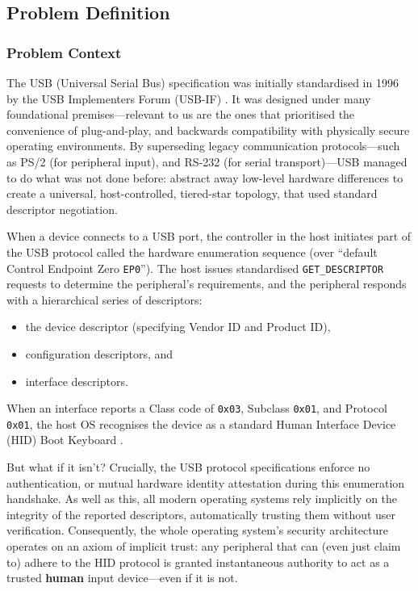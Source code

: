 \subsection{Problem Definition}

\subsubsection{Problem Context}

The USB (Universal Serial Bus) specification was initially standardised in 1996 by the USB Implementers Forum (USB-IF) \cite{usb10spec}. It was designed under many foundational premises---relevant to us are the ones that prioritised the convenience of plug-and-play, and backwards compatibility with physically secure operating environments. By superseding legacy communication protocols---such as PS/2 (for peripheral input), and RS-232 (for serial transport)---USB managed to do what was not done before: abstract away low-level hardware differences to create a universal, host-controlled, tiered-star topology, that used standard descriptor negotiation.

When a device connects to a USB port, the controller in the host initiates part of the USB protocol called the hardware enumeration sequence (over ``default Control Endpoint Zero \texttt{EP0}''). The host issues standardised \texttt{GET\_DESCRIPTOR} requests to determine the peripheral's requirements, and the peripheral responds with a hierarchical series of descriptors:

\begin{itemize}
	\item the device descriptor (specifying Vendor ID and Product ID),
	\item configuration descriptors, and
	\item interface descriptors.
\end{itemize}

When an interface reports a Class code of \texttt{0x03}, Subclass \texttt{0x01}, and Protocol \texttt{0x01}, the host OS recognises the device as a standard Human Interface Device (HID) Boot Keyboard \cite{usbSpecBC03h}.

But what if it isn't? Crucially, the USB protocol specifications enforce no authentication, or mutual hardware identity attestation during this enumeration handshake. As well as this, all modern operating systems rely implicitly on the integrity of the reported descriptors, automatically trusting them without user verification. Consequently, the whole operating system's security architecture operates on an axiom of implicit trust: any peripheral that can (even just claim to) adhere to the HID protocol is granted instantaneous authority to act as a trusted \textbf{human} input device---even if it is not.

